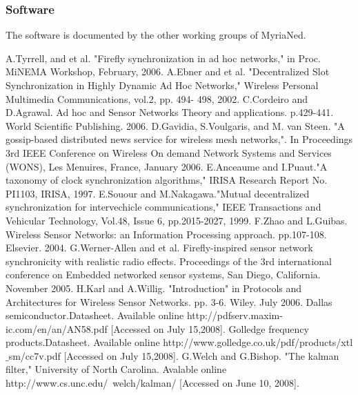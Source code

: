 \documentclass[a4paper,10pt]{report}
\begin{document}
\subsubsection{Software}
The software is documented by the other working groups of MyriaNed.
\begin{thebibliography}{\textbf{References}}
A.Tyrrell, and et al. "Firefly synchronization in ad hoc networks," in Proc. MiNEMA Workshop, February, 2006.
A.Ebner and et al. "Decentralized Slot Synchronization in Highly Dynamic Ad Hoc Networks," Wireless Personal Multimedia Communications, vol.2, pp. 494- 498, 2002.
C.Cordeiro and D.Agrawal. Ad hoc and Sensor Networks Theory and applications. p.429-441. World Scientific Publishing. 2006.
D.Gavidia, S.Voulgaris, and M. van Steen. "A gossip-based distributed news service for wireless mesh networks,". In Proceedings 3rd IEEE Conference on Wireless On demand Network Systems and Services (WONS), Les Menuires, France, January 2006.
E.Anceaume and I.Puaut."A taxonomy of clock synchronization algorithms," IRISA Research Report No. PI1103, IRISA, 1997.
E.Souour and M.Nakagawa."Mutual decentralized synchronization for intervechicle communications," IEEE Transactions and Vehicular Technology, Vol.48, Issue 6, pp.2015-2027, 1999.
F.Zhao and  L.Guibas. Wireless Sensor Networks: an Information Processing approach. pp.107-108. Elsevier. 2004.
G.Werner-Allen and et al. Firefly-inspired sensor network synchronicity with realistic radio effects. Proceedings of the 3rd international conference on Embedded networked sensor systems, San Diego, California. November 2005.
H.Karl and A.Willig. "Introduction" in Protocols and Architectures for Wireless Sensor Networks. pp. 3-6. Wiley. July 2006.
 Dallas semiconductor.Datasheet. Available online http://pdfserv.maxim-ic.com/en/an/AN58.pdf [Accessed on July 15,2008].
 Golledge frequency products.Datasheet. Available online http://www.golledge.co.uk/pdf/products/xtl$\_$sm/cc7v.pdf [Accessed on July 15,2008].
G.Welch and G.Bishop. "The kalman filter," University of North Carolina. Avalable online http://www.cs.unc.edu/~welch/kalman/ [Accessed on June 10, 2008].

\end{thebibliography}
\end{document}
